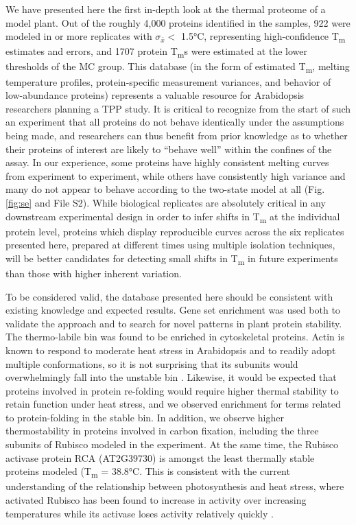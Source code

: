\documentclass[11pt,letter]{article}\usepackage[]{graphicx}\usepackage[]{color}
\newcommand{\Tm}{T\textsubscript{m}}
\newcommand{\sem}{\sigma_{\bar{x}}}
\newcommand{\celsius}[1]{#1°C}
\begin{document}
We have presented here the first in-depth look at the thermal proteome of a
model plant. Out of the roughly 4,000 proteins identified in the samples,
922 were modeled in  or more
replicates with $\sem <$ \celsius{1.5}, representing
high-confidence \Tm{} estimates and errors, and 1707 protein
\Tm{}s were estimated at the lower thresholds of the MC group. This database
(in the form of estimated \Tm{}, melting temperature profiles,
protein-specific measurement variances, and behavior of low-abundance proteins)
represents a valuable resource for Arabidopsis researchers planning a TPP
study. It is critical to recognize from the start of such an experiment that
all proteins do not behave identically under the assumptions being made, and
researchers can thus benefit from prior knowledge as to whether their proteins
of interest are likely to ``behave well'' within the confines of the assay. In
our experience, some proteins have highly consistent melting curves from
experiment to experiment, while others have consistently high variance and
many do not appear to behave according to the two-state model at all (Fig.
\ref{fig:se} and File S2). While biological
replicates are absolutely critical in any downstream experimental design in
order to infer shifts in \Tm{} at the individual protein level, proteins which
display reproducible curves across the six replicates presented here, prepared
at different times using multiple isolation techniques, will be better
candidates for detecting small shifts in \Tm{} in future experiments than
those with higher inherent variation.

To be considered valid, the database presented here should be consistent with
existing knowledge and expected results. Gene set enrichment was used both to
validate the approach and to search for novel patterns in plant protein
stability. The thermo-labile bin was found to be enriched in cytoskeletal
proteins. Actin is known to respond to moderate heat stress in Arabidopsis and
to readily adopt multiple conformations, so it is not surprising that its
subunits would overwhelmingly fall into the unstable bin
\cite{levitsky_thermal_2008, muller_cell-type-specific_2007}. Likewise, it
would be expected that proteins involved in protein re-folding would require
higher thermal stability to retain function under heat stress, and we observed
enrichment for terms related to protein-folding in the stable bin. In
addition, we observe higher thermostability in proteins involved in carbon
fixation, including the three subunits of Rubisco modeled in the experiment.
At the same time, the Rubisco activase protein RCA (AT2G39730) is amongst the
least thermally stable proteins modeled (\Tm{} =
\celsius{38.8}. This is
consistent with the current understanding of the relationship between
photosynthesis and heat stress, where activated Rubisco has been found to increase in
activity over increasing temperatures while its activase loses
activity relatively quickly \cite{crafts-brandner_rubisco_2000,
salvucci_relationship_2004}.
\end{document}
